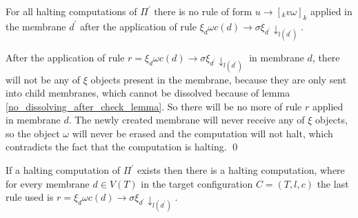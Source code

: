 \begin{lemma}
\label{no_creating_new_membrane_after_check_lemma}
  For all halting computations of $\Pi^\prime$ there is no rule of form $u\rightarrow [_k v\omega]_k$ applied in the membrane $d^\prime$ after the application of rule $\xi_d\omega c(d)\rightarrow\sigma\xi_{d^\prime}\downarrow_{l(d^\prime)}$.
\end{lemma}

\begin{dokaz}
  After the application of rule $r = \xi_d\omega c(d)\rightarrow\sigma\xi_{d^\prime}\downarrow_{l(d^\prime)}$ in membrane $d$, there will not be any of $\xi$ objects present in the membrane, because they are only sent into child membranes, which cannot be dissolved because of lemma \ref{no_dissolving_after_check_lemma}. So there will be no more of rule $r$ applied in membrane $d$. The newly created membrane will never receive any of $\xi$ objects, so the object $\omega$ will never be erased and the computation will not halt, which contradicts the fact that the computation is halting. \qed
\end{dokaz}

\begin{lemma}
\label{check_at_last_lemma}
  If a halting computation of $\Pi^\prime$ exists then there is a halting computation, where for every membrane $d\in V(T)$ in the target configuration $C=(T,l,c)$ the last rule used is $r = \xi_d\omega c(d)\rightarrow\sigma\xi_{d^\prime}\downarrow_{l(d^\prime)}$.
\end{lemma}

